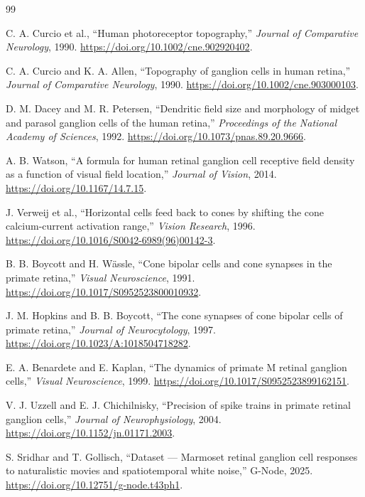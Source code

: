 \documentclass[uplatex,dvipdfmx,a4paper,10pt]{jsarticle}
\begin{document}
\begin{thebibliography}{99}
\small
{}

C. A. Curcio et al.,
``Human photoreceptor topography,''
\textit{Journal of Comparative Neurology}, 1990.
\url{https://doi.org/10.1002/cne.902920402}.

C. A. Curcio and K. A. Allen,
``Topography of ganglion cells in human retina,''
\textit{Journal of Comparative Neurology}, 1990.
\url{https://doi.org/10.1002/cne.903000103}.

D. M. Dacey and M. R. Petersen,
``Dendritic field size and morphology of midget and parasol ganglion cells of the human retina,''
\textit{Proceedings of the National Academy of Sciences}, 1992.
\url{https://doi.org/10.1073/pnas.89.20.9666}.

A. B. Watson,
``A formula for human retinal ganglion cell receptive field density as a function of visual field location,''
\textit{Journal of Vision}, 2014.
\url{https://doi.org/10.1167/14.7.15}.

J. Verweij et al.,
``Horizontal cells feed back to cones by shifting the cone calcium-current activation range,''
\textit{Vision Research}, 1996.
\url{https://doi.org/10.1016/S0042-6989(96)00142-3}.

B. B. Boycott and H. W\"assle,
``Cone bipolar cells and cone synapses in the primate retina,''
\textit{Visual Neuroscience}, 1991.
\url{https://doi.org/10.1017/S0952523800010932}.

J. M. Hopkins and B. B. Boycott,
``The cone synapses of cone bipolar cells of primate retina,''
\textit{Journal of Neurocytology}, 1997.
\url{https://doi.org/10.1023/A:1018504718282}.

E. A. Benardete and E. Kaplan,
``The dynamics of primate M retinal ganglion cells,''
\textit{Visual Neuroscience}, 1999.
\url{https://doi.org/10.1017/S0952523899162151}.

V. J. Uzzell and E. J. Chichilnisky,
``Precision of spike trains in primate retinal ganglion cells,''
\textit{Journal of Neurophysiology}, 2004.
\url{https://doi.org/10.1152/jn.01171.2003}.

S. Sridhar and T. Gollisch,
``Dataset --- Marmoset retinal ganglion cell responses to naturalistic movies and spatiotemporal white noise,''
G-Node, 2025.
\url{https://doi.org/10.12751/g-node.t43ph1}.


\end{thebibliography}
\end{document}
